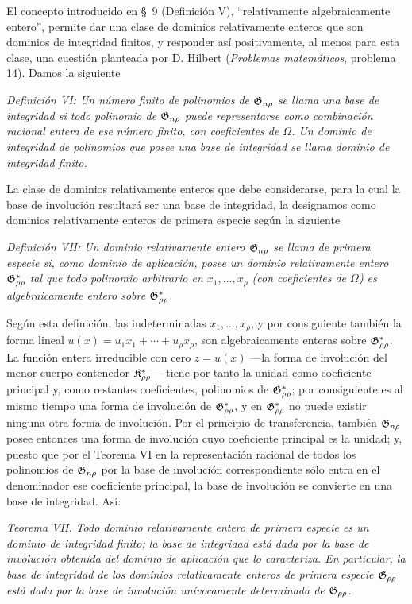 \documentclass[11pt]{article}
\begin{document}
El concepto introducido en \S\ 9 (Definición V), ``relativamente algebraicamente entero'', permite dar una clase de dominios relativamente enteros que son dominios de integridad finitos, y responder así positivamente, al menos para esta clase, una cuestión planteada por D. Hilbert (\emph{Problemas matemáticos}, problema 14). Damos la siguiente

\emph{Definición VI: Un número finito de polinomios de $\mathfrak{G}_{n\rho}$ se llama una base de integridad si todo polinomio de $\mathfrak{G}_{n\rho}$ puede representarse como combinación racional entera de ese número finito, con coeficientes de $\Omega$. Un dominio de integridad de polinomios que posee una base de integridad se llama dominio de integridad finito.}

La clase de dominios relativamente enteros que debe considerarse, para la cual la base de involución resultará ser una base de integridad, la designamos como dominios relativamente enteros de primera especie según la siguiente

\emph{Definición VII: Un dominio relativamente entero $\mathfrak{G}_{n\rho}$ se llama de primera especie si, como dominio de aplicación, posee un dominio relativamente entero $\mathfrak{G}^*_{\rho\rho}$ tal que todo polinomio arbitrario en $x_1,\ldots,x_\rho$ (con coeficientes de $\Omega$) es algebraicamente entero sobre $\mathfrak{G}^*_{\rho\rho}$.}

Según esta definición, las indeterminadas $x_1,\ldots,x_\rho$, y por consiguiente también la forma lineal $u(x)=u_1x_1+\cdots+u_\rho x_\rho$, son algebraicamente enteras sobre $\mathfrak{G}^*_{\rho\rho}$. La función entera irreducible con cero $z=u(x)$ ---la forma de involución del menor cuerpo contenedor $\mathfrak{K}^*_{\rho\rho}$--- tiene por tanto la unidad como coeficiente principal y, como restantes coeficientes, polinomios de $\mathfrak{G}^*_{\rho\rho}$; por consiguiente es al mismo tiempo una forma de involución de $\mathfrak{G}^*_{\rho\rho}$, y en $\mathfrak{G}^*_{\rho\rho}$ no puede existir ninguna otra forma de involución. Por el principio de transferencia, también $\mathfrak{G}_{n\rho}$ posee entonces una forma de involución cuyo coeficiente principal es la unidad; y, puesto que por el Teorema VI en la representación racional de todos los polinomios de $\mathfrak{G}_{n\rho}$ por la base de involución correspondiente sólo entra en el denominador ese coeficiente principal, la base de involución se convierte en una base de integridad. Así:

\emph{Teorema VII. Todo dominio relativamente entero de primera especie es un dominio de integridad finito; la base de integridad está dada por la base de involución obtenida del dominio de aplicación que lo caracteriza. En particular, la base de integridad de los dominios relativamente enteros de primera especie $\mathfrak{G}_{\rho\rho}$ está dada por la base de involución unívocamente determinada de $\mathfrak{G}_{\rho\rho}$.}
\end{document}
